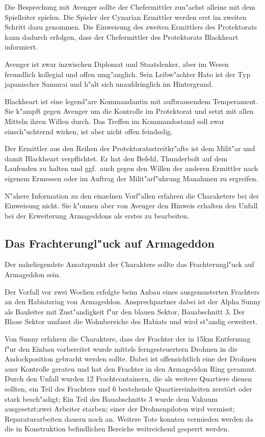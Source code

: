 \begin{remarks}
	Die Besprechung mit Avenger sollte der Chefermittler zun"achst alleine mit dem Spielleiter spielen. Die Spieler der Cynarian Ermittler werden erst im zweiten Schritt dazu genommen. Die Einweisung des zweiten Ermittlers des Protektorats kann dadurch erfolgen, dass der Chefermittler des Protektorats Blackheart informiert.
	
	Avenger ist zwar inzwischen Diplomat und Staatslenker, aber im Wesen freundlich kollegial und offen umg"anglich. Sein Leibw"achter Hato ist der Typ japanischer Samurai und h"alt sich unaufdringlich im Hintergrund.
	
	Blackheart ist eine legend"are Kommandantin mit aufbrausendem Temperament. Sie k"ampft gegen Avenger um die Kontrolle im Protektorat und setzt mit allen Mitteln ihren Willen durch. Das Treffen im Kommandostand soll zwar einsch"uchternd wirken, ist aber nicht offen feindselig.
	
	Der Ermittler aus den Reihen der Protektoratsstreitkr"afte ist dem Milit"ar und damit Blackheart verpflichtet. Er hat den Befehl, Thunderbolt auf dem Laufenden zu halten und ggf.~auch gegen den Willen der anderen Ermittler nach eigenem Ermessen oder im Auftrag der Milit"arf"uhrung Ma\3nahmen zu ergreifen.
	
	N"ahere Information zu den einzelnen Vorf"allen erfahren die Charaketere bei der Einweisung nicht. Sie k"onnen aber von Avenger den Hinweis erhalten den Unfall bei der Erweiterung Armageddons als erstes zu bearbeiten.
\end{remarks}

\subsection{Das Frachterungl"uck auf Armageddon}

Der naheliegendste Ansatzpunkt der Charaktere sollte das Frachterungl"uck auf Armageddon sein.

Der Vorfall vor zwei Wochen erfolgte beim Anbau eines ausgemusterten Frachters an den Habiatsring von Armageddon. Ansprechpartner dabei ist der Alpha Sunny als Bauleiter mit Zust"andigkeit f"ur den blauen Sektor, Bauabschnitt 3. Der Blaue Sektor umfasst die Wohnbereiche des Habiats und wird st"andig erweitert.

Von Sunny erfahren die Charaktere, dass der Frachter der in 15km Entfernung f"ur den Einbau vorbereitet wurde mittels ferngesteuertern Drohnen in die Andockposition gebracht werden sollte. Dabei ist offensichtlich eine der Drohnen au\3er Kontrolle geraten und hat den Frachter in den Armageddon Ring gerammt. Durch den Unfall wurden 12 Frachtcontainern, die als weitere Quartiere dienen sollten, ein Teil des Frachters und 6 bestehende Quartiereinheiten zerstört oder stark besch"adigt; Ein Teil des Bauabschnitts 3 wurde dem Vakuum ausgesetzt;zwei Arbeiter starben; einer der Drohnenpiloten wird vermisst; Reparaturarbeiten dauern noch an. Weitere Tote konnten vermieden werden da die in Konstruktion befindlichen Bereiche weitreichend gesperrt werden.

